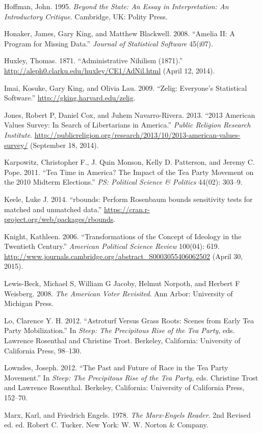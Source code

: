 \documentclass[12pt,]{article}
\begin{document}
Hoffman, John. 1995. \emph{Beyond the State: An Essay in Interpretation:
An Introductory Critique}. Cambridge, UK: Polity Press.

Honaker, James, Gary King, and Matthew Blackwell. 2008. ``Amelia II: A
Program for Missing Data.'' \emph{Journal of Statistical Software}
45(i07).

Huxley, Thomas. 1871. ``Administrative Nihilism (1871).''
\url{http://aleph0.clarku.edu/huxley/CE1/AdNil.html} (April 12, 2014).

Imai, Kosuke, Gary King, and Olivia Lau. 2009. ``Zelig: Everyone's
Statistical Software.'' \url{http://gking.harvard.edu/zelig}.

Jones, Robert P, Daniel Cox, and Juhem Navarro-Rivera. 2013. ``2013
American Values Survey: In Search of Libertarians in America.''
\emph{Public Religion Research Institute}.
\url{http://publicreligion.org/research/2013/10/2013-american-values-survey/}
(September 18, 2014).

Karpowitz, Christopher F., J. Quin Monson, Kelly D. Patterson, and
Jeremy C. Pope. 2011. ``Tea Time in America? The Impact of the Tea Party
Movement on the 2010 Midterm Elections.'' \emph{PS: Political Science \&
Politics} 44(02): 303--9.

Keele, Luke J. 2014. ``rbounds: Perform Rosenbaum bounds sensitivity
tests for matched and unmatched data.''
\url{https://cran.r-project.org/web/packages/rbounds}.

Knight, Kathleen. 2006. ``Transformations of the Concept of Ideology in
the Twentieth Century.'' \emph{American Political Science Review}
100(04): 619.
\url{http://www.journals.cambridge.org/abstract_S0003055406062502}
(April 30, 2015).

Lewis-Beck, Michael S, William G Jacoby, Helmut Norpoth, and Herbert F
Weisberg. 2008. \emph{The American Voter Revisited}. Ann Arbor:
University of Michigan Press.

Lo, Clarence Y. H. 2012. ``Astroturf Versus Grass Roots: Scenes from
Early Tea Party Mobilization.'' In \emph{Steep: The Precipitous Rise of
the Tea Party}, eds. Lawrence Rosenthal and Christine Trost. Berkeley,
California: University of California Press, 98--130.

Lowndes, Joseph. 2012. ``The Past and Future of Race in the Tea Party
Movement.'' In \emph{Steep: The Precipitous Rise of the Tea Party}, eds.
Christine Trost and Lawrence Rosenthal. Berkeley, California: University
of California Press, 152--70.

Marx, Karl, and Friedrich Engels. 1978. \emph{The Marx-Engels Reader}.
2nd Revised ed. ed. Robert C. Tucker. New York: W. W. Norton \& Company.
\end{document}
